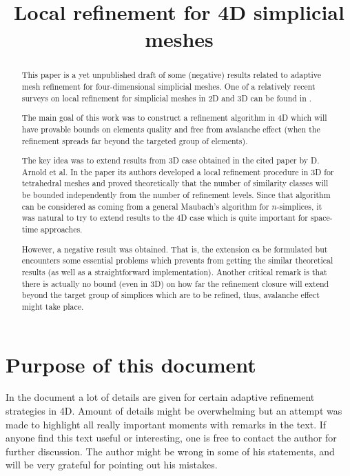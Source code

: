 \documentclass[a4paper,12pt]{amsart}
\title[Local refinement in 4D] 
{Local refinement for 4D simplicial meshes}
\numberwithin{equation}{section}
\begin{document}
 
\begin{abstract}
This paper is a yet unpublished draft of some (negative) results related to adaptive mesh refinement for four-dimensional simplicial meshes. One of a relatively recent surveys on local refinement for simplicial meshes in 2D and 3D can be found in \cite{survey}.

The main goal of this work was to construct a refinement algorithm in 4D which will have provable bounds on elements quality and free from avalanche effect (when the refinement spreads far beyond the targeted group of elements).

The key idea was to extend results from 3D case obtained in the cited paper by D. Arnold et al. In the paper its authors developed a local refinement procedure in 3D for tetrahedral meshes and proved theoretically that the number of similarity classes will be bounded independently from the number of refinement levels.
Since that algorithm can be considered as coming from a general Maubach's algorithm for $n$-simplices, it was natural to try to extend results to the 4D case which is quite important for space-time approaches.

However, a negative result was obtained. That is, the extension ca be formulated but encounters some essential problems which prevents from getting the similar theoretical results (as well as a straightforward implementation). Another critical remark is that there is actually no bound (even in 3D) on how far the refinement closure will extend beyond the target group of simplices which are to be refined, thus, avalanche effect might take place.

\end{abstract}
\maketitle

\section{Purpose of this document}
In the document a lot of details are given for  certain adaptive refinement strategies in 4D. Amount of details might be overwhelming but an attempt was made to highlight all really important moments with remarks in the text. If anyone find this text useful or interesting, one is free to contact the author for further discussion. The author might be wrong in some of his statements, and will be very grateful for pointing out his mistakes.
\end{document}
